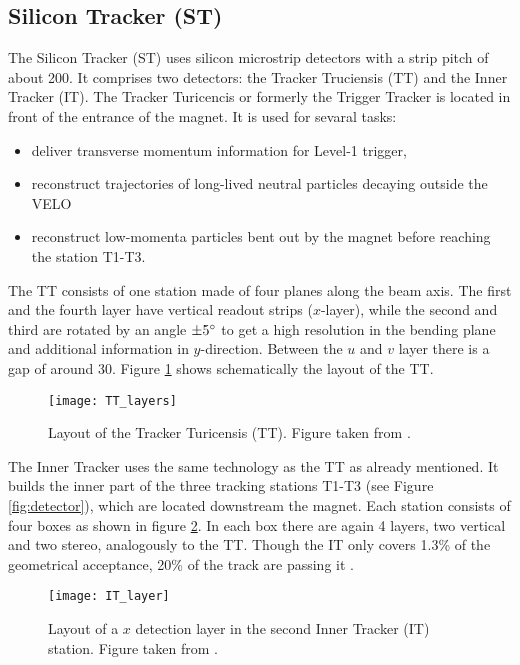 \subsection{Silicon Tracker (ST)}
The Silicon Tracker (ST) uses silicon microstrip detectors with a strip pitch of about 200\mum.
It comprises two detectors: the Tracker Truciensis (TT) and the Inner Tracker (IT).
The Tracker Turicencis or formerly the Trigger Tracker is located in front of the entrance of the \lhcb magnet. 
It is used for sevaral tasks:
\begin{itemize}
    \item deliver transverse momentum information for Level-1 trigger,
    \item reconstruct trajectories of long-lived neutral particles decaying outside the VELO
    \item reconstruct low-momenta particles bent out by the magnet before reaching the station T1-T3.
\end{itemize}
The TT consists of one station made of four planes along the beam axis. 
The first and the fourth layer have vertical readout strips ($x$-layer), while the second and third are rotated by an angle $\pm 5^{\circ}$ to get a high resolution in the bending plane and additional information in $y$-direction.
Between the $u$ and $v$ layer there is a gap of around 30\cm. 
Figure \ref{fig:TT_layers} shows schematically the layout of the TT.
\begin{figure}[hptb]
    \centering
	\texttt{[image: TT\_layers]}	
	\caption{Layout of the Tracker Turicensis (TT). 
             Figure taken from \cite{ST_Performance}.}
	\label{fig:TT_layers}
\end{figure}
The Inner Tracker uses the same technology as the TT as already mentioned. 
It builds the inner part of the three tracking stations T1-T3 (see Figure \ref{fig:detector}), which are located downstream the magnet.
Each station consists of four boxes as shown in figure \ref{fig:IT_layer}.
In each box there are again 4 layers, two vertical and two stereo, analogously to the TT. 
Though the IT only covers 1.3\% of the geometrical acceptance, 20\% of the track are passing it \cite{detector, ST_Performance}.
\begin{figure}[hptb]
    \centering
	\texttt{[image: IT\_layer]}	
	\caption{Layout of a $x$ detection layer in the second Inner Tracker (IT) station. 
             Figure taken from \cite{detector}.}
	\label{fig:IT_layer}
\end{figure}

